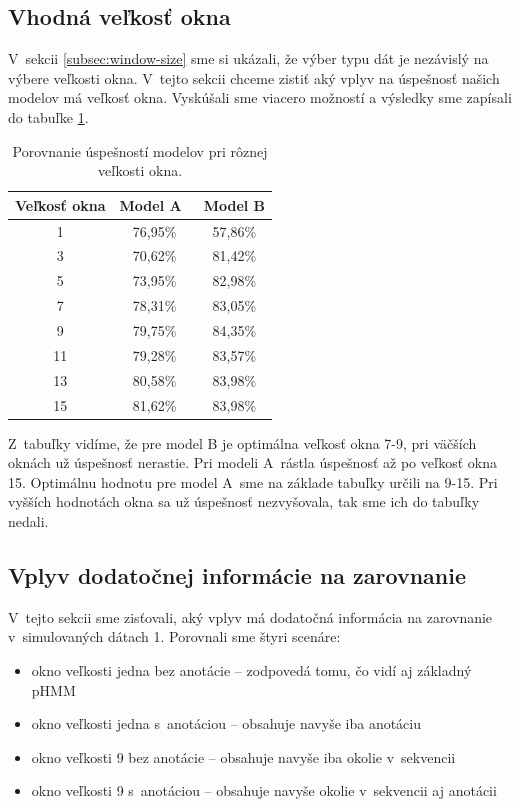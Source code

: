 \subsection{Vhodná veľkosť okna}

V~sekcii \ref{subsec:window-size} sme si ukázali, že výber typu dát je nezávislý na výbere veľkosti okna. V~tejto sekcii chceme zistiť aký vplyv na úspešnosť našich modelov má veľkosť okna.
Vyskúšali sme viacero možností a výsledky sme zapísali do tabuľke \ref{tab:window-compare}.

\begin{table}[htp]
\centering
\begin{tabular}{ccc}
\toprule
Veľkosť okna & Model A~& Model B\\
\midrule
1 & 76,95\% & 57,86\%\\
3 & 70,62\% & 81,42\%\\
5 & 73,95\% & 82,98\%\\
7 & 78,31\% & 83,05\%\\
9 & 79,75\% & 84,35\%\\
11 & 79,28\% & 83,57\%\\
13 & 80,58\% & 83,98\%\\
15 & 81,62\% & 83,98\%\\
\bottomrule
\end{tabular}
\caption[Porovnanie úspešností pri rôznej veľkosti okna]{Porovnanie úspešností modelov pri rôznej veľkosti okna.}
\label{tab:window-compare}
\end{table}

Z~tabuľky vidíme, že pre model B je optimálna veľkosť okna 7-9, pri väčších oknách už úspešnosť nerastie. Pri modeli A~rástla úspešnosť až po veľkosť okna 15. Optimálnu hodnotu pre model A~sme na základe tabuľky určili na 9-15. Pri vyšších hodnotách okna sa už úspešnosť nezvyšovala, tak sme ich do tabuľky nedali.

\subsection{Vplyv dodatočnej informácie na zarovnanie}

V~tejto sekcii sme zisťovali, aký vplyv má dodatočná informácia na zarovnanie v~simulovaných dátach 1. Porovnali sme štyri scenáre:
\begin{itemize}
    \item okno veľkosti jedna bez anotácie -- zodpovedá tomu, čo vidí aj základný pHMM
    \item okno veľkosti jedna s~anotáciou -- obsahuje navyše iba anotáciu
    \item okno veľkosti 9 bez anotácie -- obsahuje navyše iba okolie v~sekvencii
    \item okno veľkosti 9 s~anotáciou -- obsahuje navyše okolie v~sekvencii aj anotácii
\end{itemize}

